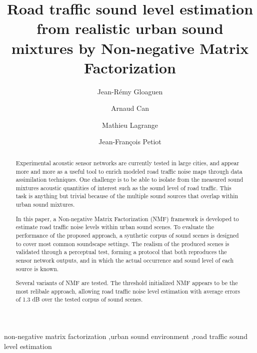 \documentclass[review,5p,twocolumn,sort&compress,times]{elsarticle}
\begin{document}
\begin{frontmatter}

\title{Road traffic sound level estimation from realistic urban sound mixtures by Non-negative Matrix Factorization}

\author[ifsttar]{Jean-R\'emy Gloaguen}
\author[ifsttar]{Arnaud Can}
\author[ls2n]{Mathieu Lagrange}
\author[ls2n]{Jean-Fran\c cois Petiot}

\address[ifsttar]{Ifsttar Centre de Nantes, UMRAE, All\'ee des Ponts et Chauss\'es, 44344 Bouguenais, France}
\address[ls2n]{LS2N, 1 rue de No\"e, 44331 Nantes, France}

\begin{abstract}

Experimental acoustic sensor networks are currently tested in large cities, and appear more and more as a useful tool to enrich modeled road traffic noise maps through data assimilation techniques. One challenge is to be able to isolate from the measured sound mixtures acoustic quantities of interest such as the  sound level of road traffic. This task is anything but trivial because of the multiple sound sources that overlap within urban sound mixtures.

In this paper, a Non-negative Matrix Factorization (NMF) framework is developed to estimate road traffic noise levels within urban sound scenes. To evaluate the performance of the proposed approach, a synthetic corpus of sound scenes is designed to cover most common soundscape settings. The realism of the produced scenes is validated through a perceptual test, forming a protocol that both reproduces the sensor network outputs, and in which the actual occurrence and sound level of each source is known.

Several variants of NMF are tested. The threshold initialized NMF appears to be the most relibale approach, allowing road traffic noise level estimation with average errors of 1.3 dB over the tested corpus of sound scenes.

\end{abstract}

\begin{keyword}
non-negative matrix factorization \sep urban sound environment \sep road traffic sound level estimation
\end{keyword}

\end{frontmatter}

\linenumbers
\end{document}
